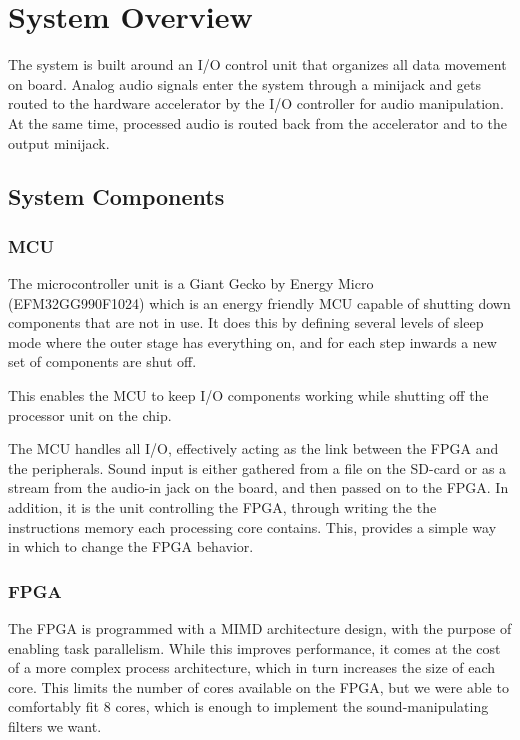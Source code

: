 \section{System Overview}

The system is built around an I/O control unit that organizes all data movement
on board. Analog audio signals enter the system through a minijack and gets
routed to the hardware accelerator by the I/O controller for audio manipulation.
At the same time, processed audio is routed back from the accelerator and to the
output minijack.

\subsection{System Components}
\subsubsection{MCU}\label{intro:system-components-mcu}
The microcontroller unit is a Giant Gecko by Energy Micro (EFM32GG990F1024)
which is an energy friendly MCU capable of shutting down components that are not
in use. It does this by defining several levels of sleep mode where the outer
stage has everything on, and for each step inwards a new set of components are
shut off.


This enables the MCU to keep I/O components working while shutting off the
processor unit on the chip.

The MCU handles all I/O, effectively acting as the link between the FPGA and the
peripherals. Sound input is either gathered from a file on the SD-card or as a
stream from the audio-in jack on the board, and then passed on to the FPGA. In
addition, it is the unit controlling the FPGA, through writing the the
instructions memory each processing core contains. This, provides a simple way
in which to change the FPGA behavior.

\subsubsection{FPGA}
The FPGA is programmed with a MIMD architecture design, with the purpose of
enabling task parallelism. While this improves performance, it comes at the cost
of a more complex process architecture, which in turn increases the size of each
core. This limits the number of cores available on the FPGA, but we were able to
comfortably fit 8 cores, which is enough to implement the sound-manipulating
filters we want.

